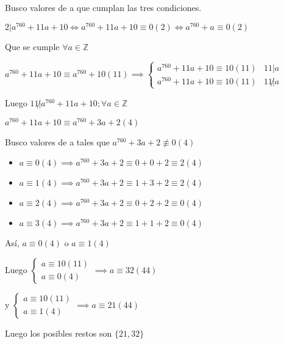 Busco valores de a que cumplan las tres condiciones.

$ 2 | a^{760} + 11a + 10 \iff a^{760} + 11a + 10 \equiv 0(2) \iff a^{760} + a \equiv 0(2) $

Que se cumple $ \forall a \in \mathbb{Z} $

$ a^{760} + 11a + 10 \equiv a^{760} + 10(11) \implies \begin{cases}
    a^{760} + 11a + 10 \equiv 10(11) & 11|a \\
    a^{760} + 11a + 10 \equiv 10(11) & 11\not |a 
\end{cases} $

Luego $ 11 \not | a^{760} + 11a + 10; \forall a \in \mathbb{Z} $

$ a^{760} + 11a + 10 \equiv a^{760} + 3a + 2 (4) $

Busco valores de a tales que $ a^{760} + 3a + 2 \not \equiv 0(4) $

\begin{itemize}
    \item $ a \equiv 0(4) \implies a^{760} + 3a + 2 \equiv 0 + 0 + 2 \equiv 2 (4) $
    \item $ a \equiv 1(4) \implies a^{760} + 3a + 2 \equiv 1 + 3 + 2 \equiv 2 (4) $
    \item $ a \equiv 2(4) \implies a^{760} + 3a + 2 \equiv 0 + 2 + 2 \equiv 0 (4) $
    \item $ a \equiv 3(4) \implies a^{760} + 3a + 2 \equiv 1 + 1 + 2 \equiv 0 (4) $
\end{itemize}

Así, $ a \equiv 0(4) $ o $ a \equiv 1(4) $

Luego $ \begin{cases}
    a \equiv 10(11) \\
    a \equiv 0(4) 
\end{cases} \implies a \equiv 32(44) $

y $ \begin{cases}
    a \equiv 10(11) \\
    a \equiv 1(4) 
\end{cases} \implies a \equiv 21(44) $

Luego los posibles restos son $ \{ 21,32 \} $


